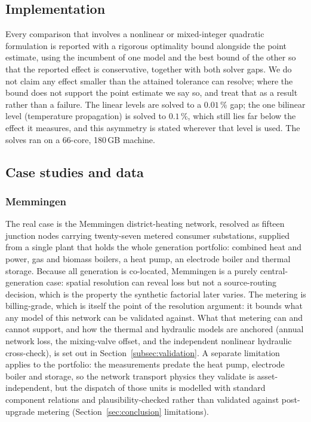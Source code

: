 \documentclass[a4paper,fleqn]{cas-sc}
\newcommand{\new}[1]{\textcolor[HTML]{1A5FB4}{#1}}   %
\newcommand{\new}[1]{#1}
\begin{document}
\subsection{Implementation}
\new{}
Every comparison that involves a nonlinear or mixed-integer quadratic formulation is reported
with a rigorous optimality bound alongside the point estimate, using the incumbent of one model
and the best bound of the other so that the reported effect is conservative, together with both
solver gaps. We do not claim any effect smaller than the attained tolerance can resolve; where
the bound does not support the point estimate we say so, and treat that as a result rather than
a failure. The linear levels are solved to a $0.01$\,\% gap; the one bilinear level
(temperature propagation) is solved to $0.1$\,\%, which still lies far below the effect it
measures, and this asymmetry is stated wherever that level is used. The solves ran on a
66-core, 180\,GB machine.

\subsection{Case studies and data}
\label{sec:cases}

\subsubsection{Memmingen}
The real case is the Memmingen district-heating network, resolved as fifteen junction nodes
carrying twenty-seven metered consumer substations, supplied from a single plant that holds
the whole generation portfolio: combined heat and power, gas and biomass boilers, a heat
pump, an electrode boiler and thermal storage. Because all generation is co-located, Memmingen
is a purely central-generation case: spatial resolution can reveal loss but not a source-routing
decision, which is the property the synthetic factorial later varies. The metering is
billing-grade, which is itself the point of the resolution argument: it bounds what any model
of this network can be validated against. What that metering can and cannot support, and how the
thermal and hydraulic models are anchored (annual network loss, the mixing-valve offset, and the
independent nonlinear hydraulic cross-check), is set out in Section~\ref{subsec:validation}. A separate
limitation applies to the portfolio: the measurements predate the heat pump, electrode boiler
and storage, so the network transport physics they validate is asset-independent, but the
dispatch of those units is modelled with standard component relations and plausibility-checked
rather than validated against post-upgrade metering (Section~\ref{sec:conclusion} limitations).

\end{document}

